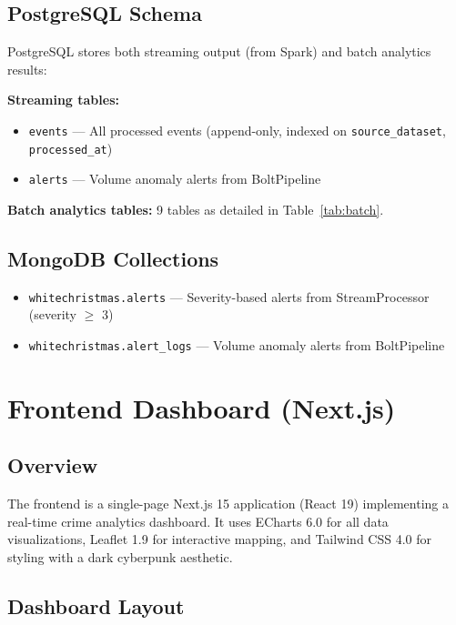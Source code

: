 \documentclass[12pt,a4paper]{article}
\begin{document}
\subsection{PostgreSQL Schema}

PostgreSQL stores both streaming output (from Spark) and batch analytics results:

\textbf{Streaming tables:}
\begin{itemize}
  \item \texttt{events} --- All processed events (append-only, indexed on \texttt{source\_dataset}, \texttt{processed\_at})
  \item \texttt{alerts} --- Volume anomaly alerts from BoltPipeline
\end{itemize}

\textbf{Batch analytics tables:} 9 tables as detailed in Table~\ref{tab:batch}.

\subsection{MongoDB Collections}

\begin{itemize}
  \item \texttt{whitechristmas.alerts} --- Severity-based alerts from StreamProcessor (severity $\geq$ 3)
  \item \texttt{whitechristmas.alert\_logs} --- Volume anomaly alerts from BoltPipeline
\end{itemize}

\section{Frontend Dashboard (Next.js)}

\subsection{Overview}

The frontend is a single-page Next.js 15 application (React 19) implementing a real-time crime analytics dashboard. It uses ECharts 6.0 for all data visualizations, Leaflet 1.9 for interactive mapping, and Tailwind CSS 4.0 for styling with a dark cyberpunk aesthetic.

\subsection{Dashboard Layout}
\end{document}
